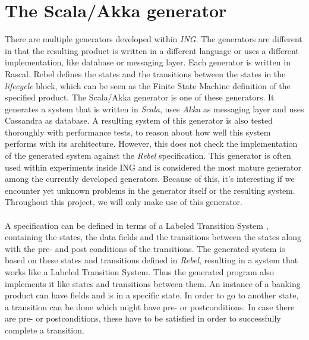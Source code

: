 \section{The Scala/Akka generator}
There are multiple generators developed within \textit{ING}. The generators are different in that the resulting product is written in a different language or uses a different implementation, like database or messaging layer. Each generator is written in Rascal. Rebel defines the states and the transitions between the states in the \textit{lifecycle} block, which can be seen as the Finite State Machine definition of the specified product. The Scala/Akka generator is one of these generators. It generates a system that is written in \textit{Scala}, uses \textit{Akka} \cite{siteAkka2017} as messaging layer and uses Cassandra \cite{siteCassandra2016} as database. A resulting system of this generator is also tested thoroughly with performance tests, to reason about how well this system performs with its architecture. However, this does not check the implementation of the generated system against the \textit{Rebel} specification. This generator is often used within experiments inside ING and is considered the most mature generator among the currently developed generators. Because of this, it's interesting if we encounter yet unknown problems in the generator itself or the resulting system. Throughout this project, we will only make use of this generator.\\
\\
A specification can be defined in terms of a Labeled Transition System \cite{stoel2016solving} , containing the states, the data fields and the transitions between the states along with the pre- and post conditions of the transitions. The generated system is based on these states and transitions defined in \textit{Rebel}, resulting in a system that works like a Labeled Transition System. Thus the generated program also implements it like states and transitions between them. An instance of a banking product can have fields and is in a specific state. In order to go to another state, a transition can be done which might have pre- or postconditions. In case there are pre- or postconditions, these have to be satisfied in order to successfully complete a transition.\\
